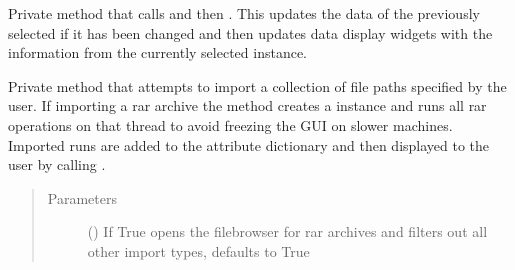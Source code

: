 \documentclass[letterpaper,10pt,english]{sphinxmanual}
\begin{document}
\begin{fulllineitems}
\begin{fulllineitems}
\label{\detokenize{polo.windows:polo.windows.run_importer.RunImporterDialog._handle_candidate_change}}
Private method that calls 
{\hyperref[\detokenize{polo.windows:polo.windows.run_importer.RunImporterDialog._update_selected_candidate}]{}}
and then  {\hyperref[\detokenize{polo.windows:polo.windows.run_importer.RunImporterDialog._populate_fields}]{}}. 
This updates the data of the previously selected 
{\hyperref[\detokenize{polo.windows:polo.windows.run_importer.ImportCandidate}]{}} if it has been changed and then
updates data display widgets with the information from the currently selected
{\hyperref[\detokenize{polo.windows:polo.windows.run_importer.ImportCandidate}]{}} instance.

\end{fulllineitems}


\begin{fulllineitems}
\label{\detokenize{polo.windows:polo.windows.run_importer.RunImporterDialog._import_files}}
Private method that attempts to import a collection of file paths
specified by the user. If importing a rar archive the method 
creates a {\hyperref[\detokenize{polo.threads:polo.threads.thread.QuickThread}]{}} 
instance and runs all rar operations on that 
thread to avoid freezing the GUI on slower machines. 
Imported runs are added to the  attribute
dictionary and then displayed to the user by calling
.
\begin{quote}\begin{description}
\item[{Parameters}] \leavevmode
{} (\sphinxstyleliteralemphasis{\sphinxupquote{, }}) \textendash{} If True opens the filebrowser for rar archives and filters
out all other import types, defaults to True


\end{description}
\end{quote}
\end{fulllineitems}
\end{fulllineitems}
\end{document}
